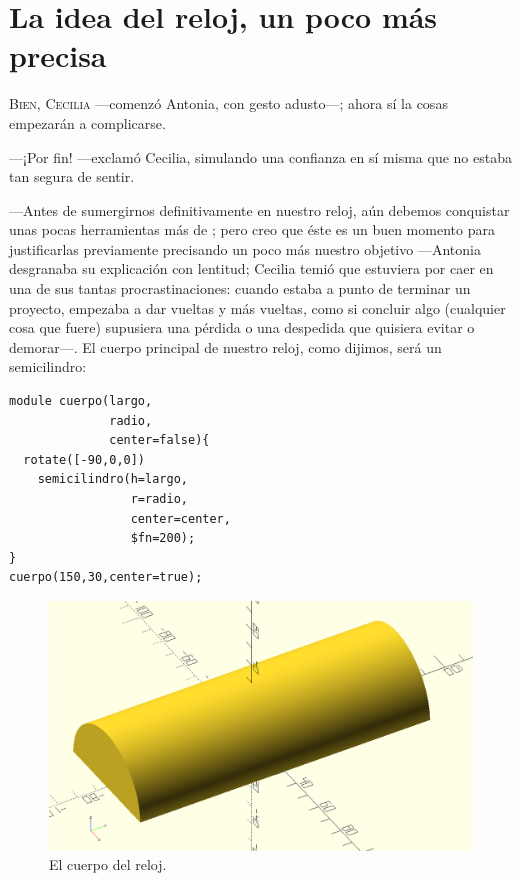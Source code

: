
\chapter{La idea del reloj, un poco más precisa}

\lettrine[ante=\raisebox{-1.5ex}{\Large ---},lines=2]{B}{ien, Cecilia}
---comenzó Antonia, con gesto a\-dus\-\mbox{to---;} ahora sí la cosas empezarán a
complicarse.

---¡Por fin! ---exclamó Cecilia, simulando una confianza en sí misma
que no estaba tan segura de sentir.

---Antes de sumergirnos definitivamente en nuestro reloj, aún debemos
conquistar unas pocas herramientas más de \openscad{}; pero creo que
éste es un buen momento para justificarlas previamente precisando un
poco más nuestro objetivo ---Antonia desgranaba su explicación con
lentitud; Cecilia temió que estuviera por caer en una de sus tantas
procrastinaciones: cuando estaba a punto de terminar un proyecto,
empezaba a dar vueltas y más vueltas, como si concluir algo (cualquier
cosa que fuere) supusiera una pérdida o una despedida que quisiera
evitar o demorar---. El cuerpo principal de nuestro reloj, como
dijimos, será un semicilindro:

    \begin{lstlisting}
module cuerpo(largo,
              radio,
              center=false){
  rotate([-90,0,0])
    semicilindro(h=largo,
                 r=radio,
                 center=center,
                 $fn=200);
}
cuerpo(150,30,center=true);
    \end{lstlisting}%

  \begin{figure}[ht]
    \centering
    \includegraphics[width=.7\textwidth]{imagenes/cuerpo-base-reloj}
      \caption{El cuerpo del reloj.}
      \label{fig:cuerpo-base-reloj}
    \end{figure}

